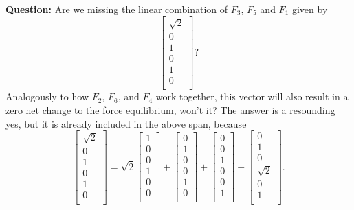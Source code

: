\textbf{Question:} Are we missing the linear combination of $F_3$, $F_5$ and $F_1$ given by
$$\left[\begin{array}{r} \sqrt{2} \\0 \\  1\\ 0\\ 1\\0 \\ \end{array} \right] ?$$ Analogously to how  $F_2$, $F_6$, and $F_4$ work together, this vector will also result in a zero net change to the force equilibrium, won't it? The answer is a resounding yes, but it is already included in the above span, because
$$\left[\begin{array}{r} \sqrt{2} \\0 \\  1\\ 0\\ 1\\0 \\ \end{array} \right] =\sqrt{2}
 \left[\begin{array}{c} 1\\0 \\  0\\1 \\ 0\\0 \\ \end{array} \right] +
\left[\begin{array}{c} 0\\1\\  0\\0 \\ 1\\0 \\ \end{array} \right] +
\left[\begin{array}{c} 0\\0 \\  1\\0 \\ 0\\1 \\ \end{array} \right]-
\left[\begin{array}{r} 0\\1 \\  0\\ \sqrt{2} \\ 0\\1 \\ \end{array} \right].$$

